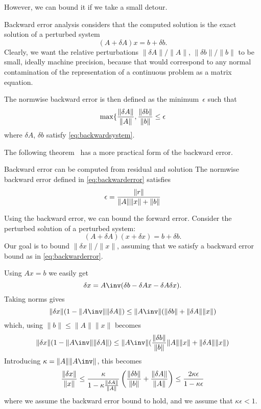 \documentclass[11pt]{artikel3}
\begin{document}
\begin{Outline}
However, we can bound it if we take a small detour.

Backward error analysis considers that the computed solution is the
exact solution of a perturbed system 
\begin{equation}
    (A+\delta A)x=b+\delta b.
    \label{eq:backwardsystem}\end{equation}
Clearly, we want the relative perturbations $\|\delta A\|/\|A\|$,
$\|\delta b\|/\|b\|$ to be small, ideally machine precision, because
that would correspond to any normal contamination of the
representation of a continuous problem as a matrix equation.

The normwise backward error is then defined as
the minimum~$\epsilon$ such that 
\begin{equation}
     \max\{{\|\delta A\|\over \|A\|}, {\|\delta b\|\over\|b\|}
     \leq\epsilon
    \label{eq:backwarderror}\end{equation}
where $\delta A$, $\delta b$ satisfy \eqref{eq:backwardsystem}.

The following theorem~\cite{RigalGaches:compatibility} has a more
practical form of the backward error.
\begin{ttheorem}{Backward error can be computed from residual and
    solution}
The normwise backward error defined in \eqref{eq:backwarderror}
satisfies
\begin{equation}
    \epsilon={\|r\| \over \|A\|\|x\|+\|b\|}
    \label{eq:backwardcompute}\end{equation}
\end{ttheorem}

Using the backward error, we can bound the forward error. Consider the
perturbed solution of a perturbed system:
\[ (A+\delta A)(x+\delta x)=b+\delta b. \]
Our goal is to bound $\|\delta x\|/\|x\|$, assuming that we satisfy a
backward error bound as in \eqref{eq:backwarderror}.

Using $Ax=b$ we easily get
\[ \delta x=A\inv (\delta b-\delta Ax-\delta A\delta x). \]
Taking norms gives
\[ \|\delta x\|(1-\|A\inv\|\|\delta A\|)
    \leq \|A\inv\|(\|\delta b\|+\|\delta A\|\|x\|)
\]
which, using $\|b\|\leq\|A\|\|x\|$ becomes
\[ \|\delta x\|(1-\|A\inv\|\|\delta A\|)
    \leq \|A\inv\| ( {\|\delta b\|\over\|b\|}\|A\|\|x\|
                     + \|\delta A\|\|x\| )
\]
Introducing $\kappa=\|A\|\|A\inv\|$, this becomes
\begin{equation}
    {\|\delta x\|\over \|x\|} \leq
    {\kappa\over 1-\kappa{\|\delta A\|\over\|A\|}}
        \left(
          {\|\delta b\|\over \|b\|}+{\|\delta A\|\over \|A\|}
        \right)
    \leq {2\kappa\epsilon\over 1-\kappa\epsilon}
    \label{eq:forwardestimate}\end{equation}
where we assume the backward error bound to hold, and we assume that
$\kappa\epsilon<1$.


\end{Outline}
\end{document}
